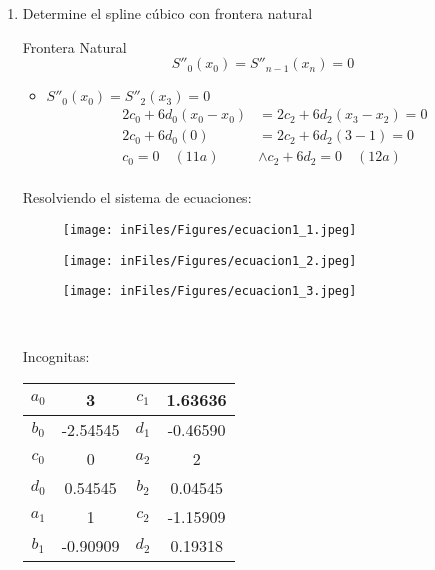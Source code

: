 \documentclass[12pt]{article}
\begin{document}
\begin{enumerate}
\begin{enumerate}
        \item Determine el spline cúbico con frontera natural
        
        Frontera Natural
        \[S''_0(x_0) = S''_{n-1}(x_n) = 0\]
        \begin{itemize}
            \item $S''_0(x_0) = S''_{2}(x_3) = 0$
            \[
            \begin{aligned}
                2c_0 + 6d_0(x_0 -x_0) &= 2c_2 + 6d_2(x_3 -x_2) = 0 \\
                2c_0 + 6d_0(0) &= 2c_2 + 6d_2(3-1) = 0\\
                c_0 = 0 \quad (11a)&\land c_2 + 6d_2 = 0\quad(12a)\\
            \end{aligned}
            \]
        \end{itemize}

        Resolviendo el sistema de ecuaciones:
        \begin{figure}
        \centering
        \texttt{[image: inFiles/Figures/ecuacion1\_1.jpeg]}
        \label{fig:etiqueta}
        \end{figure}
        \begin{figure}
        \centering
        \texttt{[image: inFiles/Figures/ecuacion1\_2.jpeg]}
        \label{fig:etiqueta}
        \end{figure}
                \begin{figure}
        \centering
        \texttt{[image: inFiles/Figures/ecuacion1\_3.jpeg]}
        \label{fig:etiqueta}
        \end{figure}




        \
        \
        \

        Incognitas:
        \begin{table}[h]
        \centering
        \begin{tabular}{|c|c|c|c|}
        \hline
        $a_0$& 3 &$c_1$& 1.63636 \\\hline 
        $b_0$& -2.54545 &$d_1$& -0.46590 \\\hline
        $c_0$& 0 &$a_2$& 2 \\\hline
        $d_0$& 0.54545 &$b_2$& 0.04545 \\\hline
        $a_1$& 1 &$c_2$&  -1.15909\\\hline
        $b_1$& -0.90909 &$d_2$& 0.19318 \\\hline
        \end{tabular}
        \label{tab:ejemplo64}
        \end{table}
 

\end{enumerate}
\end{enumerate}
\end{document}
